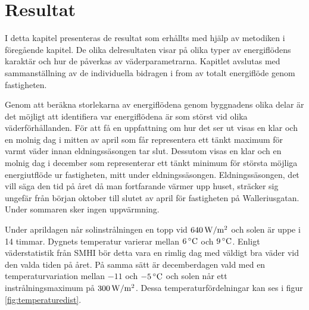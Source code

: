 \chapter{Resultat}

I detta kapitel presenteras de resultat som erhållts med hjälp av metodiken i föregående kapitel. De olika delresultaten visar på olika typer av energiflödens karaktär och hur de påverkas av väderparametrarna. Kapitlet avslutas med sammanställning av de individuella bidragen i from av totalt energiflöde genom fastigheten.

Genom att beräkna storlekarna av energiflödena genom byggnadens olika delar är det möjligt att identifiera var energiflödena är som störst vid olika väderförhållanden. För att få en uppfattning om hur det ser ut visas en klar och en molnig dag i mitten av april som får representera ett tänkt maximum för varmt väder innan eldningssäsongen tar slut. Dessutom visas en klar och en molnig dag i december som representerar ett tänkt minimum för största möjliga energiutflöde ur fastigheten, mitt under eldningssäsongen. Eldningssäsongen, det vill säga den tid på året då man fortfarande värmer upp huset, sträcker sig ungefär från början oktober till slutet av april för fastigheten på Walleriusgatan. Under sommaren sker ingen uppvärmning.

Under aprildagen når solinstrålningen en topp vid $\unit[640]{W/m^2}$ och solen är uppe i 14 timmar. Dygnets temperatur varierar mellan $\unit[6]{^\circ C}$ och $\unit[9]{^\circ C}$. Enligt väderstatistik från SMHI\cite{SMHIdata} bör detta vara en rimlig dag med väldigt bra väder vid den valda tiden på året. På samma sätt är decemberdagen vald med en temperaturvariation mellan $-11$ och $\unit[-5]{^\circ C}$ och solen når ett instrålningsmaximum på $\unit[300]{W/m^2}$. Dessa temperaturfördelningar kan ses i figur \ref{fig:temperaturedist}. 









% 


